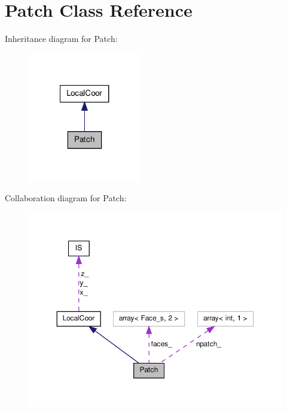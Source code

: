 \hypertarget{classPatch}{\section{Patch Class Reference}
\label{classPatch}
}


Inheritance diagram for Patch\-:\nopagebreak
\begin{figure}[H]
\begin{center}
\leavevmode
\includegraphics[width=140pt]{classPatch__inherit__graph}
\end{center}
\end{figure}


Collaboration diagram for Patch\-:\nopagebreak
\begin{figure}[H]
\begin{center}
\leavevmode
\includegraphics[width=350pt]{classPatch__coll__graph}
\end{center}
\end{figure}
